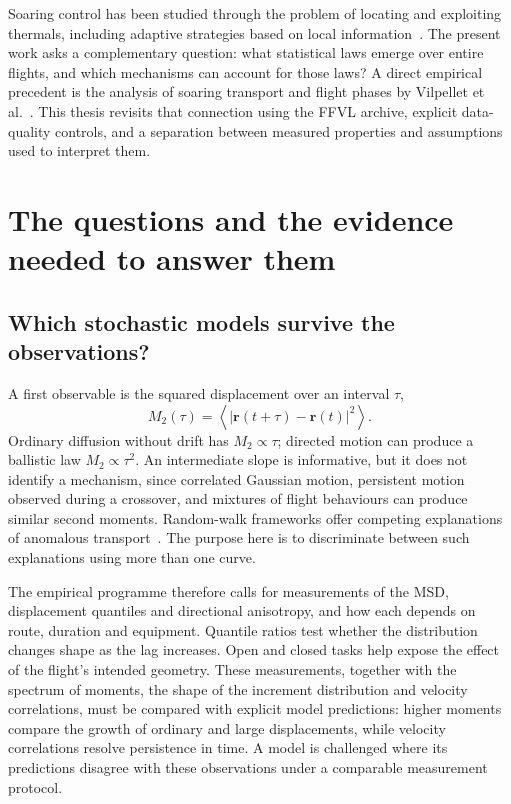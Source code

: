 Soaring control has been studied through the problem of locating and exploiting thermals,
including adaptive strategies based on local information~\cite{reddy2016}. The present
work asks a complementary question: what statistical laws emerge over entire flights, and
which mechanisms can account for those laws? A direct empirical precedent is the analysis
of soaring transport and flight phases by Vilpellet et al.~\cite{vilpellet2026}. This
thesis revisits that connection using the FFVL archive, explicit data-quality controls,
and a separation between measured properties and assumptions used to interpret them.

\section{The questions and the evidence needed to answer them}

\subsection{Which stochastic models survive the observations?}

A first observable is the squared displacement over an interval $\tau$,
\begin{equation}
  M_2(\tau)=\left\langle\left|\mathbf r(t+\tau)-\mathbf r(t)\right|^2\right\rangle.
  \label{eq:intro-msd}
\end{equation}
Ordinary diffusion without drift has $M_2\propto\tau$; directed motion can produce a ballistic law
$M_2\propto\tau^2$. An intermediate slope is informative, but it does not identify a
mechanism, since correlated Gaussian motion, persistent motion observed during a crossover,
and mixtures of flight behaviours can produce similar second moments. Random-walk
frameworks offer competing explanations of anomalous transport~\cite{metzler2000}.
The purpose here is to discriminate between such explanations using more than one curve.

The empirical programme therefore calls for measurements of the MSD, displacement
quantiles and directional anisotropy, and how each depends on route, duration and
equipment.
Quantile ratios test whether the distribution changes shape as the lag increases. Open
and closed tasks help expose the effect of the flight's intended geometry. These
measurements, together with the spectrum of moments, the shape of the increment
distribution and velocity correlations, must be compared with explicit model predictions: higher
moments compare the growth of ordinary and large displacements, while velocity correlations
resolve persistence in time. A model is challenged where its predictions disagree with these
observations under a comparable measurement protocol.

